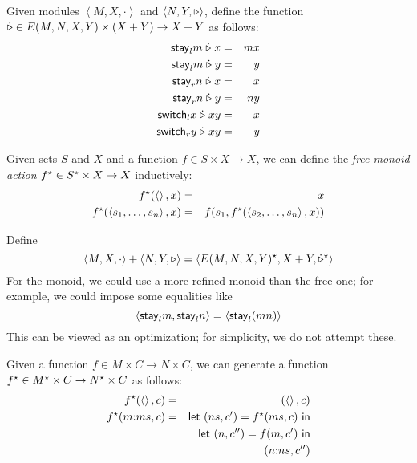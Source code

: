 \begin{defn}[$R$-similarity]
\begin{theorem}
\begin{lemma}
\begin{theorem}[No products]
\begin{lemma}
\begin{defn}
\begin{theorem}
\begin{corollary}[Hylomorphism]
\begin{defn}
\begin{defn}[Symmetrization]
\begin{theorem}
\begin{definition}
Given modules $\left<M,X,\cdot\right>$ and $\left<N,Y,\triangleright\right>$, define
the function $\dot{\triangleright} \in E(M,N,X,Y) \times (X + Y) \to X + Y$ as follows:
\begin{eqnarray*}
    \mathsf{stay}_lm \mathrel{\dot{\triangleright}}  x &=&  mx \\
    \mathsf{stay}_lm \mathrel{\dot{\triangleright}}  y &=&  y \\
    \mathsf{stay}_rn \mathrel{\dot{\triangleright}}  x &=&  x \\
    \mathsf{stay}_rn \mathrel{\dot{\triangleright}}  y &=&  ny \\
    \mathsf{switch}_lx \mathrel{\dot{\triangleright}} xy &=&  x \\
    \mathsf{switch}_ry \mathrel{\dot{\triangleright}} xy &=&  y
\end{eqnarray*}
\end{definition}

\begin{definition}
Given sets $S$ and $X$ and a function $f \in S \times X \to X$, we can define
the \emph{free monoid action} $f^\star \in S^\star \times X \to X$ inductively:
\begin{eqnarray*}
    f^\star(\left<\right>,x) &=& x \\
    f^\star(\left<s_1,\ldots,s_n\right>,x) &=& f(s_1,f^\star(\left<s_2,\ldots,s_n\right>,x))
\end{eqnarray*}
\end{definition}

\begin{definition}
Define
\[\left<M,X,\cdot\right>+\left<N,Y,\triangleright\right> =
\left<E(M,N,X,Y)^\star,X+Y,\dot{\triangleright}^\star\right>\]
For the monoid, we could use a more refined monoid than the free one; for
example, we could impose some equalities like
\[\left<\mathsf{stay}_lm,\mathsf{stay}_ln\right> = \left<\mathsf{stay}_l(mn)\right>\]
This can be viewed as an optimization; for simplicity, we do not attempt
these.
\end{definition}

\begin{definition}
Given a function $f \in M \times C \to N \times C$, we can generate a
function $f^\star \in M^\star \times C \to N^\star \times C$ as follows:
\begin{eqnarray*}
    f^\star(\left<\right>,c) &=& (\left<\right>,c) \\
    f^\star(m \mathord{:} ms,c)
    &=& \mathsf{let}\  (ns, c') = f^\star(ms, c) \ \mathsf{in} \\
    & & \mathsf{let}\  (n, c'') = f(m, c') \ \mathsf{in} \\
    & & (n \mathord{:} ns,c'')
\end{eqnarray*}
\end{definition}


\end{theorem}
\end{defn}
\end{defn}
\end{corollary}
\end{theorem}
\end{defn}
\end{lemma}
\end{theorem}
\end{lemma}
\end{theorem}
\end{defn}

